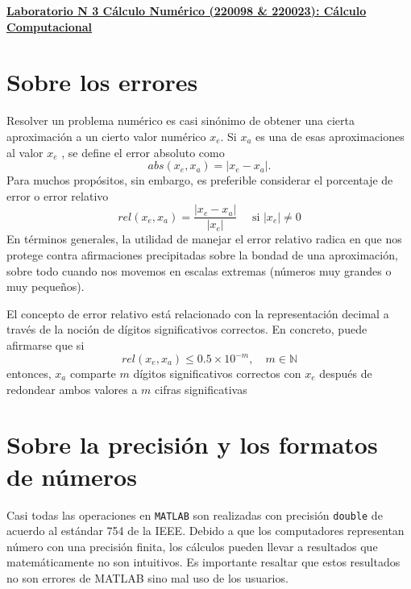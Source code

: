 \documentclass[12pt,letterpaper]{article}
\begin{document}
\hspace*{-1,5cm}

\vspace*{0.1cm} \centerline {\bf\underline{Laboratorio N 3 C\'alculo Num\'erico (220098 \& 220023): C\'alculo Computacional}} \vskip0.5cm


\section{Sobre los errores}

Resolver un problema num\'erico es casi sin\'onimo de obtener una cierta aproximaci\'on a
un cierto valor num\'erico $x_e$. Si $x_a$ es una de esas aproximaciones al valor $x_e$ , se define el
error absoluto como
$$
abs(x_e,x_a)=|x_e - x_a|.
$$
Para muchos prop\'ositos, sin embargo, es preferible considerar el porcentaje de error o
error relativo
$$
rel(x_e,x_a)=\frac{|x_e-x_a|}{|x_e|} \quad \text{ si } |x_e|\neq 0
$$
En t\'erminos generales, la utilidad de manejar el error relativo radica en que nos protege
contra afirmaciones precipitadas sobre la bondad de una aproximaci\'on, sobre todo cuando
nos movemos en escalas extremas (n\'umeros muy grandes o muy peque\~{n}os).

El concepto de error relativo est\'a relacionado con la representaci\'on decimal a trav\'es de
la noci\'on de d\'igitos significativos correctos. En concreto, puede afirmarse que si
$$
rel(x_e,x_a) \leq  0.5 \times 10^{-m}, \quad m \in \mathbb{N}
$$
entonces, $x_a$ comparte $m$ d\'igitos significativos correctos con $x_e$ despu\'es de redondear ambos
valores a $m$ cifras significativas

\section{ \textbf{Sobre la precisi\'on y los formatos de n\'umeros}}

Casi todas las operaciones en \texttt{MATLAB} son realizadas con precisi\'on \texttt{double} de acuerdo al est\'andar 754 de la IEEE. Debido a que los computadores representan n\'umero con una precisi\'on finita, los c\'alculos pueden llevar a resultados que matem\'aticamente no son intuitivos. Es importante resaltar que estos resultados no son errores de MATLAB sino mal uso de los usuarios.
\end{document}
